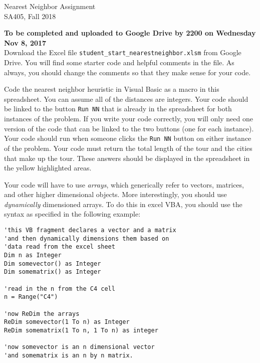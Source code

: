 \documentclass[10pt]{article}
\begin{document}
\begin{center}
  {\sc Nearest Neighbor Assignment}\\
  {\sc SA405, Fall 2018} \\
\end{center}

\medskip

{\bf To be completed and uploaded to Google Drive by 2200 on Wednesday Nov 8, 2017} \\



Download the Excel file \verb!student_start_nearestneighbor.xlsm! from Google Drive.  You will find some starter code and helpful comments in the file.  As always, you should change the comments so that they make sense for your code.

Code the nearest neighbor
heuristic in Visual Basic as a macro in this spreadsheet. You can
assume all of the distances are integers.  Your code should be linked to the button \verb!Run NN! that is already in the spreadsheet for both instances of the problem.  If you write your code correctly, you will only need one version of the code that can be linked to the two buttons (one for each instance).  Your code should run when someone clicks the \verb!Run NN! button on either instance of the problem.  Your code must return the total length of the tour and the cities that make up the tour.  These answers should be displayed in the spreadsheet in the yellow highlighted areas.

Your code will have to use {\it arrays}, which generically refer to
vectors, matrices, and other higher dimensional objects.  More
interestingly, you should use {\it dynamically} dimensioned arrays. To
do this in excel VBA, you should use the syntax as specified in the
following example:
\begin{verbatim}
'this VB fragment declares a vector and a matrix
'and then dynamically dimensions them based on 
'data read from the excel sheet
Dim n as Integer
Dim somevector() as Integer 
Dim somematrix() as Integer

'read in the n from the C4 cell 
n = Range("C4") 

'now ReDim the arrays
ReDim somevector(1 To n) as Integer
ReDim somematrix(1 To n, 1 To n) as integer

'now somevector is an n dimensional vector
'and somematrix is an n by n matrix.
\end{verbatim}
\end{document}
